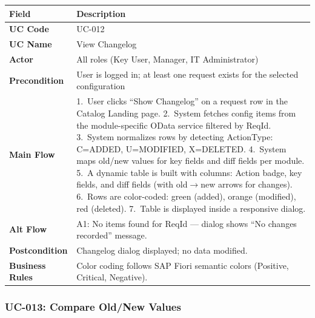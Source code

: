 \documentclass[12pt,a4paper]{report}
\begin{document}
\begin{longtable}{|>{\bfseries}p{2.8cm}|p{12cm}|}
  \hline
  \rowcolor{tableheadpeach}
  \textbf{Field} & \textbf{Description} \\ \hline
  \endhead \hline \endfoot
  UC Code       & UC-012 \\ \hline
  UC Name       & View Changelog \\ \hline
  Actor         & All roles (Key User, Manager, IT Administrator) \\ \hline
  Precondition  & User is logged in; at least one request exists for the selected configuration \\ \hline
  Main Flow     & 1.~User clicks ``Show Changelog'' on a request row in the Catalog Landing page.
                  2.~System fetches config items from the module-specific OData service filtered by ReqId.
                  3.~System normalizes rows by detecting ActionType: C=ADDED, U=MODIFIED, X=DELETED.
                  4.~System maps old/new values for key fields and diff fields per module.
                  5.~A dynamic table is built with columns: Action badge, key fields, and diff fields (with old$\rightarrow$new arrows for changes).
                  6.~Rows are color-coded: green (added), orange (modified), red (deleted).
                  7.~Table is displayed inside a responsive dialog. \\ \hline
  Alt Flow      & A1: No items found for ReqId --- dialog shows ``No changes recorded'' message. \\ \hline
  Postcondition & Changelog dialog displayed; no data modified. \\ \hline
  Business Rules& Color coding follows SAP Fiori semantic colors (Positive, Critical, Negative). \\ \hline
\end{longtable}

\subsubsection{UC-013: Compare Old/New Values}
\end{document}
